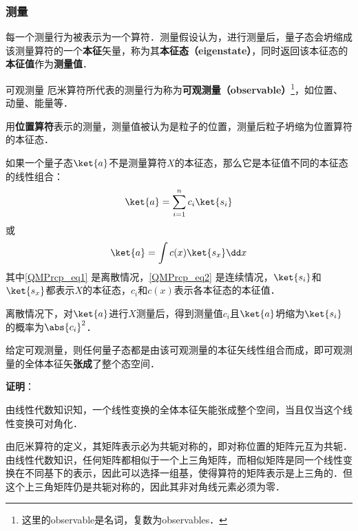 \subsubsection{测量}

每一个测量行为被表示为一个算符．测量假设认为，进行测量后，量子态会坍缩成该测量算符的一个\textbf{本征}矢量，称为其\textbf{本征态（eigenstate）}，同时返回该本征态的\textbf{本征值}作为\textbf{测量值}．


\begin{definition}{可观测量}\label{QMPrcp_def14}
厄米算符所代表的测量行为称为\textbf{可观测量（observable）}\footnote{这里的observable是名词，复数为observables．}，如位置、动量、能量等．
\end{definition}


\begin{example}{}
用\textbf{位置算符}表示的测量，测量值被认为是粒子的位置，测量后粒子坍缩为位置算符的本征态．
\end{example}

如果一个量子态$\ket{a}$不是测量算符$X$的本征态，那么它是本征值不同的本征态的线性组合：
\begin{equation}\label{QMPrcp_eq1}
\ket{a} = \sum_{i=1}^{n} c_i\ket{s_i}
\end{equation}
或
\begin{equation}\label{QMPrcp_eq2}
\ket{a} = \int c(x)\ket{s_x}\dd x
\end{equation}
其中\autoref{QMPrcp_eq1} 是离散情况，\autoref{QMPrcp_eq2} 是连续情况，$\ket{s_i}$和$\ket{s_x}$都表示$X$的本征态，$c_i$和$c(x)$表示各本征态的本征值．

离散情况下，对$\ket{a}$进行$X$测量后，得到测量值$c_i$且$\ket{a}$坍缩为$\ket{s_i}$的概率为$\abs{c_i}^2$．


\begin{theorem}{}
给定可观测量，则任何量子态都是由该可观测量的本征矢线性组合而成，即可观测量的全体本征矢\textbf{张成}了整个态空间．
\end{theorem}

\textbf{证明}：

由线性代数知识知，一个线性变换的全体本征矢能张成整个空间，当且仅当这个线性变换可对角化．

由厄米算符的定义，其矩阵表示必为共轭对称的，即对称位置的矩阵元互为共轭．由线性代数知识，任何矩阵都相似于一个上三角矩阵，而相似矩阵是同一个线性变换在不同基下的表示，因此可以选择一组基，使得算符的矩阵表示是上三角的．但这个上三角矩阵仍是共轭对称的，因此其非对角线元素必须为零．

